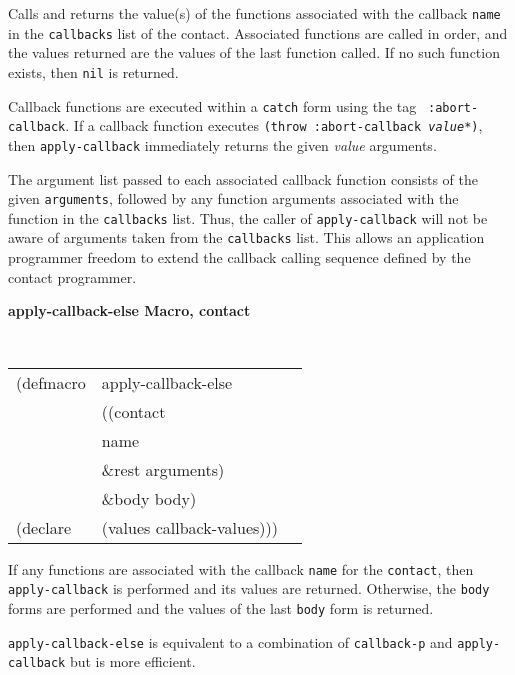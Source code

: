 \begin{flushright} 
\parbox[t]{6.125in}{
Calls and returns the value(s) of the functions associated with the callback
{\tt name} in the
{\tt callbacks} list of the contact. Associated functions are called in order,
and the values returned are the values of the last function called. If no such
function exists, then {\tt nil} is returned.} 

\parbox[t]{6.125in}{
Callback functions are executed within a {\tt catch} form using the tag {\tt
:abort-callback}.  If a callback function executes {\tt (throw :abort-callback
{\em value*})}, then {\tt apply-callback} immediately returns the given {\em
value} arguments.
}

\parbox[t]{6.125in}{ The argument list passed to each associated callback
function consists of the given {\tt arguments}, followed by any function
arguments associated with the function in the {\tt callbacks} list.  Thus, the
caller of {\tt apply-callback} will not be aware of arguments taken from the
{\tt callbacks} list.  This allows an application programmer freedom to extend
the callback calling sequence defined by the contact programmer.  }
\end{flushright}

{\samepage
{\large {\bf apply-callback-else \hfill Macro, contact}} 

\begin{flushright} \parbox[t]{6.125in}{
\tt
\begin{tabular}{lll}
\raggedright
(defmacro & apply-callback-else & \\ 
& ((contact\\
&  name\\
& \&rest arguments)\\
& \&body body)\\        
(declare &(values callback-values)))
\end{tabular}
\rm

}\end{flushright}
}

\begin{flushright} 
\parbox[t]{6.125in}{
If any functions are associated with the callback
{\tt name} for the {\tt contact}, then {\tt apply-callback} is performed
and its values are returned. Otherwise, the {\tt body} forms are
performed and the values of the last {\tt body} form is returned.

{\tt apply-callback-else} is equivalent to a combination of
{\tt callback-p} and {\tt apply-callback} but is more efficient.}
\end{flushright}

